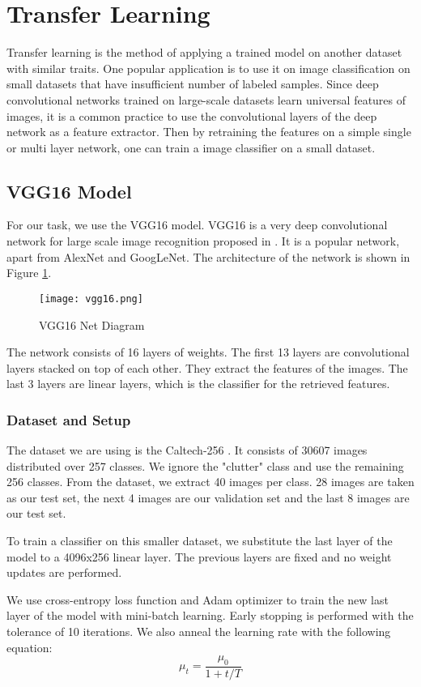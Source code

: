 \section{Transfer Learning}
Transfer learning is the method of applying a trained model on another dataset with similar traits. One popular application is to use it on image classification on small datasets that have insufficient number of labeled samples. Since deep convolutional networks trained on large-scale datasets learn universal features of images, it is a common practice to use the convolutional layers of the deep network as a feature extractor. Then by retraining the features on a simple single or multi layer network, one can train a image classifier on a small dataset.

\subsection{VGG16 Model}
For our task, we use the VGG16 model. VGG16 is a very deep convolutional network for large scale image recognition proposed in \cite{Simon}. It is a popular network, apart from AlexNet and GoogLeNet. The architecture of the network is shown in Figure \ref{vgg}.
\begin{figure}[H]
	\centering
	\texttt{[image: vgg16.png]}%
	\caption{VGG16 Net Diagram \cite{vgg16fig}}
 	\label{vgg}
\end{figure}
The network consists of 16 layers of weights. The first 13 layers are convolutional layers stacked on top of each other. They extract the features of the images. The last 3 layers are linear layers, which is the classifier for the retrieved features.

\subsubsection{Dataset and Setup}
The dataset we are using is the Caltech-256 \cite{caltech}. It consists of 30607 images distributed over 257 classes. We ignore the "clutter" class and use the remaining 256 classes. From the dataset, we extract 40 images per class. 28 images are taken as our test set, the next 4 images are our validation set and the last 8 images are our test set.
 
To train a classifier on this smaller dataset, we substitute the last layer of the model to a 4096x256 linear layer. The previous layers are fixed and no weight updates are performed. 

We use cross-entropy loss function and Adam optimizer to train the new last layer of the model with mini-batch learning. Early stopping is performed with the tolerance of 10 iterations. We also anneal the learning rate with the following equation: 
\begin{equation}
\mu_t = \dfrac{\mu_0}{1+t/T}
\end{equation}

